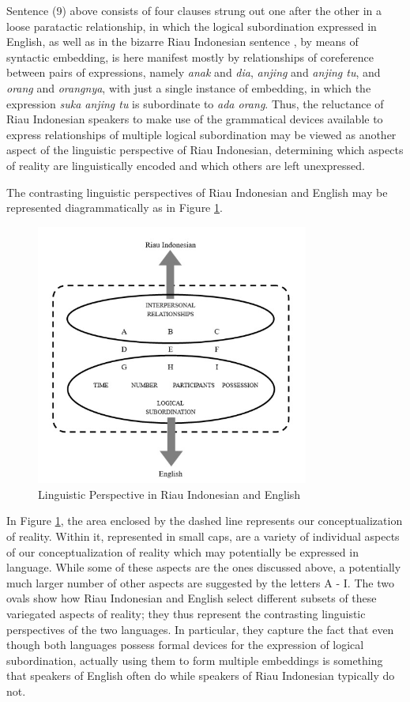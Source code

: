 \documentclass[output=paper,colorlinks,citecolor=brown
]{langscibook}
\begin{document}
Sentence (9) above consists of four clauses strung out one after the other in a loose paratactic relationship, in which the logical subordination expressed in English, as well as in the bizarre Riau Indonesian sentence , by means of syntactic embedding, is here manifest mostly by relationships of coreference between pairs of expressions, namely \emph{anak} and \emph{dia}, \emph{anjing} and \emph{anjing tu}, and \emph{orang} and \emph{orangnya}, with just a single instance of embedding, in which the expression \emph{suka anjing tu} is subordinate to \emph{ada orang}.  Thus, the reluctance of Riau Indonesian speakers to make use of the grammatical devices available to express relationships of multiple logical subordination may be viewed as another aspect of the linguistic perspective of Riau Indonesian, determining which aspects of reality are linguistically encoded and which others are left unexpressed.

The contrasting linguistic perspectives of Riau Indonesian and English may be represented diagrammatically as in Figure \ref{fig:gil:fig4}.

\begin{figure}
\centering
\includegraphics[width=0.8\textwidth]{gil_figure4.png}
\caption{\label{fig:gil:fig4}Linguistic Perspective in Riau Indonesian and English}
\end{figure}

In Figure \ref{fig:gil:fig4}, the area enclosed by the dashed line represents our conceptualization of reality.  Within it, represented in small caps, are a variety of individual aspects of our conceptualization of reality which may potentially be expressed in language.  While some of these aspects are the ones discussed above, a potentially much larger number of other aspects are suggested by the letters A - I.  The two ovals show how Riau Indonesian and English select different subsets of these variegated aspects of reality; they thus represent the contrasting linguistic perspectives of the two languages.  In particular, they capture the fact that even though both languages possess formal devices for the expression of logical subordination, actually using them to form multiple embeddings is something that speakers of English often do while speakers of Riau Indonesian typically do not.
\end{document}
